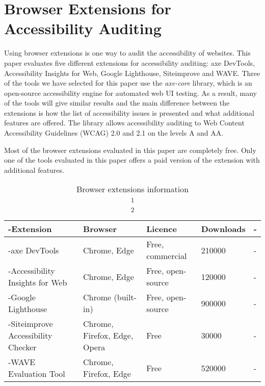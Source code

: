 \chapter{Browser Extensions for Accessibility Auditing}

\label{chap:Intro}

Using browser extensions is one way to audit the accessibility of websites.
This paper evaluates five different extensions for accessibility auditing: axe DevTools, Accessibility Insights for Web, Google Lighthouse, Siteimprove and WAVE.
Three of the tools we have selected for this paper use the \emph{axe-core} library, which is an open-source accessibility engine for automated web UI testing.
As a result, many of the tools will give similar results and the main difference between the extensions is how the list of accessibility issues is presented and what additional features are offered.
The library allows accessibility auditing to Web Content Accessibility Guidelines (WCAG) 2.0 and 2.1 on the levels A and AA.

Most of the browser extensions evaluated in this paper are completely free.
Only one of the tools evaluated in this paper offers a paid version of the extension with additional features.

\begin{table}[tp]
\tablestretch
{}
\centering
\begin{tabularx}{\linewidth}
{>{\kern-\tabcolsep}lllXX<{\kern-\tabcolsep}}
\toprule
\textbf{Extension} & \textbf{Browser} & \textbf{Licence} & \textbf{Downloads\footnotemark}
\\
\midrule
axe DevTools & Chrome, Edge & Free, commercial & 210000 \\
%
Accessibility Insights for Web & Chrome, Edge & Free, open-source & 120000 \\
%
Google Lighthouse & Chrome (built-in) & Free, open-source & 900000\footnotemark \\
%
Siteimprove Accessibility Checker & Chrome, Firefox, Edge, Opera & Free & 30000 \\
%
WAVE Evaluation Tool & Chrome, Firefox, Edge & Free & 520000 \\
\bottomrule
\end{tabularx}
\caption[Browser Extensions Information]
{
Browser extensions information \\
\textsuperscript{1} \\
\textsuperscript{2}
}
\label{tab:browser-extensions-info}
\end{table}

